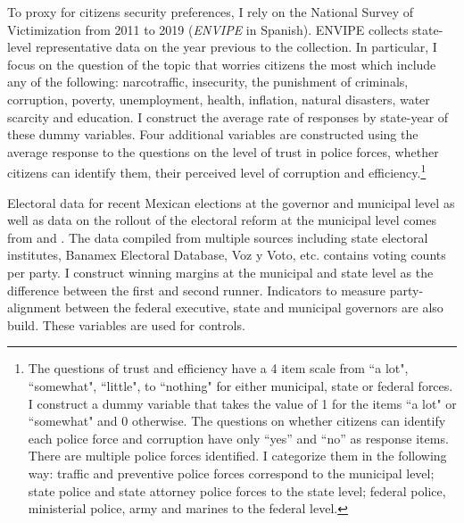 \documentclass[12pt]{amsart}
\numberwithin{equation}{section}
\theoremstyle{definition}
\theoremstyle{definition}
\theoremstyle{definition}
\begin{document}
To proxy for citizens security preferences, I rely on the National Survey of Victimization from 2011 to 2019 (\emph{ENVIPE} in Spanish). ENVIPE collects state-level representative data on the year previous to the collection.  In particular, I focus on the question of the topic that worries citizens the most which include any of the following: narcotraffic, insecurity, the punishment of criminals, corruption, poverty, unemployment, health, inflation, natural disasters, water scarcity and education. I construct the average rate of responses by state-year of these dummy variables. Four additional variables are constructed using the average response to the questions on the level of trust in police forces, whether citizens can identify them, their perceived level of corruption and efficiency.\footnote{The questions of trust and efficiency have a 4 item scale from ``a lot", ``somewhat", ``little", to  ``nothing" for either municipal, state or federal forces. I construct a dummy variable that takes the value of 1 for the items ``a lot" or ``somewhat" and 0 otherwise. The questions on whether citizens can identify each police force and corruption have only ``yes'' and ``no'' as response items. There are multiple police forces identified. I categorize them in the following way: traffic and preventive police forces correspond to the municipal level; state police and state attorney police forces to the state level; federal police, ministerial police, army and marines to the federal level.} 
 
Electoral data for recent Mexican elections at the governor and municipal level as well as data on the rollout of the electoral reform at the municipal level comes from \citet{magar_2012} and \citet{magar_2017}. The data compiled from multiple sources including state electoral institutes, Banamex Electoral Database, Voz y Voto, etc. contains voting counts per party. I construct winning margins at the municipal and state level as the difference between the first and second runner.  Indicators to measure party-alignment between the federal executive, state and municipal governors are also build. These variables are used for controls. 
\end{document}
